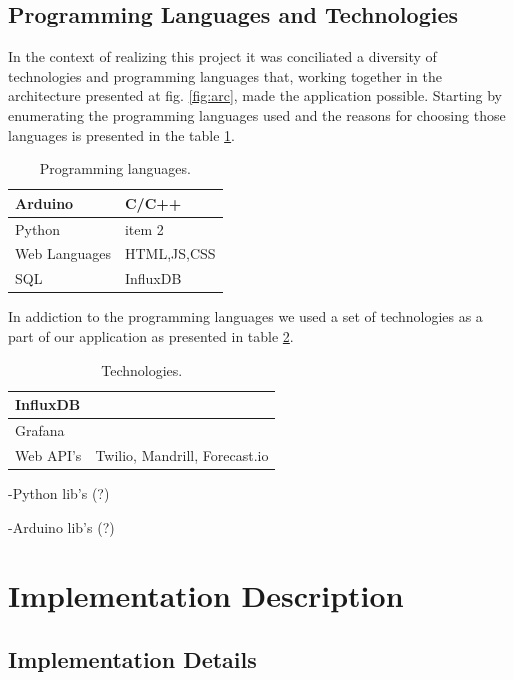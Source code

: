 \documentclass[12pt]{report}
\begin{document}
\subsection{Programming Languages and Technologies}

In the context of realizing this project it was conciliated a diversity of technologies and programming languages that, working together in the architecture presented at fig. \ref{fig:arc}, made the application possible. Starting by enumerating the programming languages used and the reasons for choosing those languages is presented in the table \ref{tab:prolangs}.


\begin{table}[H]
\begin{tabularx}{0.8\textwidth}{ |l|X| }
  	\hline
  	Arduino  & C/C++  \\
 	\hline
 	Python  & item 2   \\
  	\hline
 	Web Languages  & HTML,JS,CSS   \\
	\hline
	SQL  & InfluxDB   \\
	\hline
\end{tabularx}
	\caption{Programming languages.}
  	\label{tab:prolangs}
\end{table}

In addiction to the programming languages we used a set of technologies as a part of our application as presented in table \ref{tab:tech}.

\begin{table}[H]
\begin{tabularx}{0.8\textwidth}{ |l|X| }
  	\hline
  	InfluxDB  &   \\
 	\hline
 	Grafana  &   \\
  	\hline
 	Web API's & Twilio, Mandrill, Forecast.io   \\
	\hline
\end{tabularx}
	\caption{Technologies.}
  	\label{tab:tech}
\end{table}

-Python lib's (?)

-Arduino lib's (?)

\section{Implementation Description}

\subsection{Implementation Details}
\end{document}
